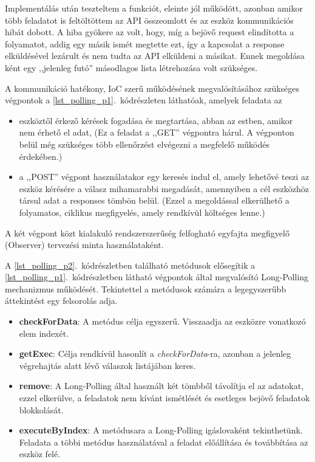 \documentclass{thesis-ekf}
\theoremstyle{definition}
\theoremstyle{remark}
\begin{document}
	Implementálás után teszteltem a funkciót, eleinte jól működött, azonban amikor több feladatot is feltöltöttem az API összeomlott és az eszköz kommunikációs hibát dobott. A hiba gyökere az volt, hogy, míg a bejövő request elindította a folyamatot, addig egy másik ismét megtette ezt, így a kapcsolat a response elküldésével lezárult és nem tudta az API elküldeni a másikat. Ennek megoldása ként egy ,,jelenleg futó'' másodlagos lista létrehozása volt szükséges.
	
	A kommunikáció hatékony, IoC szerű működésének megvalósításához szükséges végpontok a \ref{lst_polling_p1}.~kódrészleten láthatóak, amelyek feladata az
	\begin{itemize}
		\item eszköztől érkező kérések fogadása és megtartása, abban az estben, amikor nem érhető el adat, (Ez a feladat a ,,GET'' végpontra hárul. A végponton belül még szükséges több ellenőrzést elvégezni a megfelelő működés érdekében.)
		\item a ,,POST'' végpont használatakor egy keresés indul el, amely lehetővé teszi az eszköz kérésére a válasz mihamarabbi megadását, amennyiben a cél eszközhöz társul adat a responses tömbön belül. (Ezzel a megoldással elkerülhető a folyamatos, ciklikus megfigyelés, amely rendkívül költséges lenne.)
	\end{itemize}
	A két végpont közt kialakuló rendszerszerűség felfogható egyfajta megfigyelő (Observer) tervezési minta használataként.
	
	A \ref{lst_polling_p2}.~kódrészletben található metódusok elősegítik a \ref{lst_polling_p1}.~kódrészletben látható végpontok által megvalósító Long-Polling mechanizmus működését. Tekintettel a metódusok számára a legegyszerűbb áttekintést egy felsorolás adja.
	\begin{itemize}
		\item \textbf{checkForData}: A metódus célja egyszerű. Visszaadja az eszközre vonatkozó elem indexét.
		\item \textbf{getExec}: Célja rendkívül hasonlít a \textit{checkForData}-ra, azonban a jelenleg végrehajtás alatt lévő válaszok listájában keres.
		\item \textbf{remove}: A Long-Polling által használt két tömbből távolítja el az adatokat, ezzel elkerülve, a feladatok nem kívánt ismétlését és esetleges bejövő feladatok blokkolását.
		\item \textbf{executeByIndex}: A metódusara a Long-Polling igáslovaként tekinthetünk. Feladata a többi metódus használatával a feladat előállítása és továbbítása az eszköz felé.
	\end{itemize}
	
\end{document}
